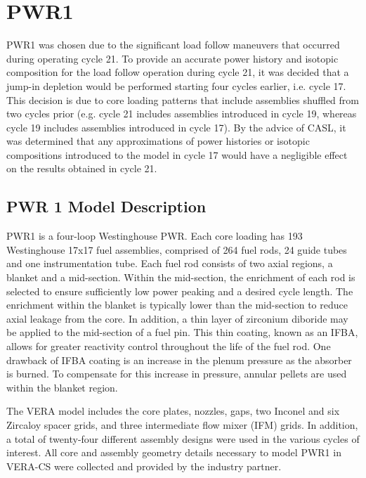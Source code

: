 \documentclass[edeposit,fullpage,12pt]{uiucthesis2009}
\begin{document}





\chapter{PWR1}
PWR1 was chosen due to the significant load follow maneuvers that occurred during operating cycle 21. 
To provide an accurate power history and isotopic composition for the load follow operation during cycle 21, it was decided that a jump-in depletion would be performed starting four cycles earlier, i.e. cycle 17. 
This decision is due to core loading patterns that include assemblies shuffled from two cycles prior (e.g. cycle 21 includes assemblies introduced in cycle 19, whereas cycle 19 includes assemblies introduced in cycle 17). 
By the advice of CASL, it was determined that any approximations of power histories or isotopic compositions introduced to the model in cycle 17 would have a negligible effect on the results obtained in cycle 21.


\section{PWR 1 Model Description}
PWR1 is a four-loop Westinghouse PWR.
Each core loading has 193 Westinghouse 17x17 fuel assemblies, comprised of 264 fuel rods, 24 guide tubes and one instrumentation tube. 
Each fuel rod consists of two axial regions, a blanket and a mid-section. 
Within the mid-section, the enrichment of each rod is selected to ensure sufficiently low power peaking and a desired cycle length. 
The enrichment within the blanket is typically lower than the mid-section to reduce axial leakage from the core. 
In addition, a thin layer of zirconium diboride may be applied to the mid-section of a fuel pin. 
This thin coating, known as an \gls{IFBA}, allows for greater reactivity control throughout the life of the fuel rod. 
One drawback of IFBA coating is an increase in the plenum pressure as the absorber is burned. 
To compensate for this increase in pressure, annular pellets are used within the blanket region. 

The VERA model includes the core plates, nozzles, gaps, two Inconel and six Zircaloy spacer grids, and three intermediate flow mixer (IFM) grids. 
In addition, a total of twenty-four different assembly designs were used in the various cycles of interest. 
All core and assembly geometry details necessary to model PWR1 in VERA-CS were collected and provided by the industry partner.
\end{document}

